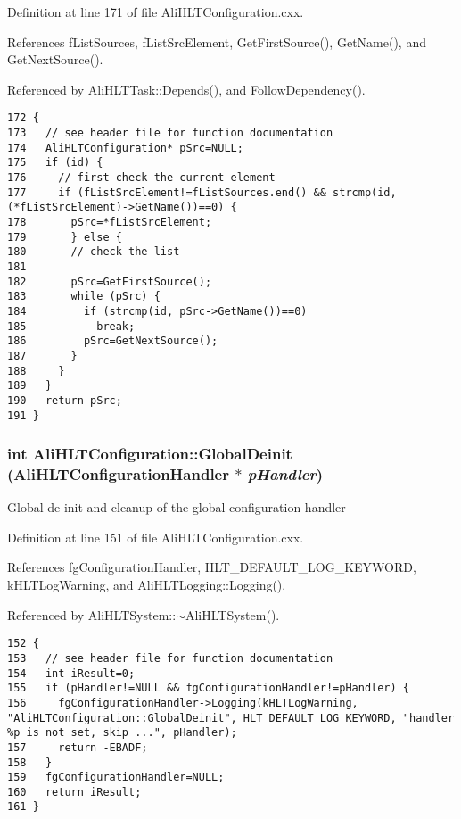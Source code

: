 Definition at line 171 of file Ali\-HLTConfiguration.cxx.

References f\-List\-Sources, f\-List\-Src\-Element, Get\-First\-Source(), Get\-Name(), and Get\-Next\-Source().

Referenced by Ali\-HLTTask::Depends(), and Follow\-Dependency().

\footnotesize\begin{verbatim}172 {
173   // see header file for function documentation
174   AliHLTConfiguration* pSrc=NULL;
175   if (id) {
176     // first check the current element
177     if (fListSrcElement!=fListSources.end() && strcmp(id, (*fListSrcElement)->GetName())==0) {
178       pSrc=*fListSrcElement;
179       } else {
180       // check the list
181 
182       pSrc=GetFirstSource();
183       while (pSrc) {
184         if (strcmp(id, pSrc->GetName())==0)
185           break;
186         pSrc=GetNextSource();
187       }
188     }
189   }
190   return pSrc;
191 }
\end{verbatim}\normalsize 


\subsubsection{\setlength{\rightskip}{0pt plus 5cm}int Ali\-HLTConfiguration::Global\-Deinit ({\bf Ali\-HLTConfiguration\-Handler} $\ast$ {\em p\-Handler})\hspace{0.3cm}{\tt  [static]}}\label{classAliHLTConfiguration_e1}


Global de-init and cleanup of the global configuration handler 

Definition at line 151 of file Ali\-HLTConfiguration.cxx.

References fg\-Configuration\-Handler, HLT\_\-DEFAULT\_\-LOG\_\-KEYWORD, k\-HLTLog\-Warning, and Ali\-HLTLogging::Logging().

Referenced by Ali\-HLTSystem::$\sim$Ali\-HLTSystem().

\footnotesize\begin{verbatim}152 {
153   // see header file for function documentation
154   int iResult=0;
155   if (pHandler!=NULL && fgConfigurationHandler!=pHandler) {
156     fgConfigurationHandler->Logging(kHLTLogWarning, "AliHLTConfiguration::GlobalDeinit", HLT_DEFAULT_LOG_KEYWORD, "handler %p is not set, skip ...", pHandler);
157     return -EBADF;
158   }
159   fgConfigurationHandler=NULL;
160   return iResult;
161 }
\end{verbatim}\normalsize 


